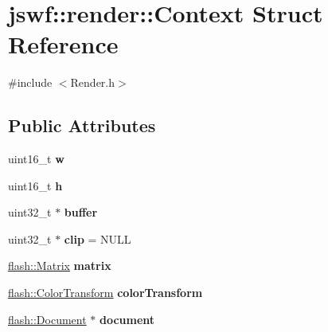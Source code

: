 \hypertarget{structjswf_1_1render_1_1_context}{\section{jswf\+:\+:render\+:\+:Context Struct Reference}
\label{structjswf_1_1render_1_1_context}
}


{\ttfamily \#include $<$Render.\+h$>$}

\subsection*{Public Attributes}
\begin{DoxyCompactItemize}
\item 
\hypertarget{structjswf_1_1render_1_1_context_afe4f5780493a0e06b7f1814b99cb30e5}{uint16\+\_\+t {\bfseries w}}\label{structjswf_1_1render_1_1_context_afe4f5780493a0e06b7f1814b99cb30e5}

\item 
\hypertarget{structjswf_1_1render_1_1_context_a980b0157be571b58ec939d691067b2f8}{uint16\+\_\+t {\bfseries h}}\label{structjswf_1_1render_1_1_context_a980b0157be571b58ec939d691067b2f8}

\item 
\hypertarget{structjswf_1_1render_1_1_context_a0ac41bf5c33e320c9110b4b4e15e1965}{uint32\+\_\+t $\ast$ {\bfseries buffer}}\label{structjswf_1_1render_1_1_context_a0ac41bf5c33e320c9110b4b4e15e1965}

\item 
\hypertarget{structjswf_1_1render_1_1_context_a94c6275ef656062d820b00bee4635a4c}{uint32\+\_\+t $\ast$ {\bfseries clip} = N\+U\+L\+L}\label{structjswf_1_1render_1_1_context_a94c6275ef656062d820b00bee4635a4c}

\item 
\hypertarget{structjswf_1_1render_1_1_context_afe7d8b50188784d2509c1bc36c29db38}{\hyperlink{structjswf_1_1flash_1_1_matrix}{flash\+::\+Matrix} {\bfseries matrix}}\label{structjswf_1_1render_1_1_context_afe7d8b50188784d2509c1bc36c29db38}

\item 
\hypertarget{structjswf_1_1render_1_1_context_a4bb2f94db91982e512568032722fb19e}{\hyperlink{structjswf_1_1flash_1_1_color_transform}{flash\+::\+Color\+Transform} {\bfseries color\+Transform}}\label{structjswf_1_1render_1_1_context_a4bb2f94db91982e512568032722fb19e}

\item 
\hypertarget{structjswf_1_1render_1_1_context_aa5c663199a983f23d1fb56f18b6cc4af}{\hyperlink{classjswf_1_1flash_1_1_document}{flash\+::\+Document} $\ast$ {\bfseries document}}\label{structjswf_1_1render_1_1_context_aa5c663199a983f23d1fb56f18b6cc4af}

\end{DoxyCompactItemize}


